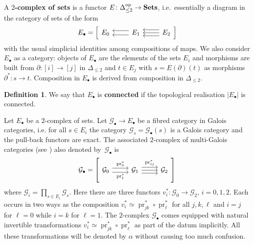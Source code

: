 \documentclass[a4paper,twoside,11pt,reqno]{amsart}
\newcommand{\cG}{{\mathcal G}}
\DeclareMathOperator{\pr}{pr}
\newcommand{\op}{{\rm op}}
\newcommand{\cat}[1]{\mathbf{#1}}
\newcommand{\Sets}{\cat{Sets}}
\theoremstyle{definition}
\newtheorem{defi}[thm]{Definition}
\numberwithin{equation}{subsection}
\begin{document}
A \textbf{$2$-complex of sets} is a functor $E \colon \Delta_{\leq 2}^\op  \to \Sets$, 
i.e.~essentially a diagram in the category of sets of the form
\[
E_\bullet = \Big[\begin{tikzcd}
E_0 & \ar[l,shift right=0.7ex] \ar[l,shift left=0.7ex] E_1 & \ar[l,shift right=1ex] \ar[l,shift left=1ex] \ar[l] E_2  
\end{tikzcd}\Big]
\]
with the usual simplicial identities among compositions of maps. 
We also consider $E_\bullet$ as a category: objects of $E_\bullet$ are the elements of the sets $E_i$ and morphisms are built from $\partial\colon [i] \to [j]$ in $\Delta_{\leq 2}$ and $t \in E_j$ with $s = E(\partial)(t)$ as  morphisms $\partial^\ast\colon s \to t$. Composition in $E_\bullet$ is derived from composition in $\Delta_{\leq 2}$. 

\begin{defi}
    We say that $E_\bullet$ is \textbf{connected} if the topological realisation $|E_\bullet|$ is connected. 
\end{defi}

Let $E_\bullet$ be a $2$-complex of sets. Let $\cG_\bullet \to E_\bullet$ be a fibred category in Galois categories, i.e. for all $s \in E_i$ the category $\cG_s = \cG_\bullet(s)$ is a Galois category and the pull-back functors are exact. The associated $2$-complex of multi-Galois categories (see \cite[V~\S9]{SGA1})
also denoted by~$\cG_\bullet$ is 
\[
\cG_\bullet = \left[\begin{tikzcd}
\cG_0 \ar[r,shift right=0.7ex,"{\pr_1^\ast}",swap] \ar[r,shift left=0.7ex,"\pr_0^\ast"]  &  \cG_1 \ar[r, shift left=1ex,"{\pr_{ij}^\ast}"] \ar[r,shift right=1ex] \ar[r] & \cG_2 
\end{tikzcd}\right]
\]
where $\cG_i = \prod_{s \in E_i} \cG_s$. Here there are three functors $v_i^\ast \colon \cG_0 \to \cG_2$, $i=0,1,2$. Each occurs in two ways as the composition $v_i^\ast \simeq  \pr_{jk}^\ast \circ \pr_\ell^\ast$ for all $j,k,\ell$ and $i = j$ for $\ell = 0$ while $i = k$ for $\ell = 1$. 
The $2$-complex $\cG_\bullet$ comes equipped with natural invertible transformations $v_i^\ast \simeq  \pr_{jk}^\ast \circ \pr_\ell^\ast$ as part of the datum implicitly. All these transformations will be denoted by $\alpha$ without causing too much confusion. 
\end{document}
